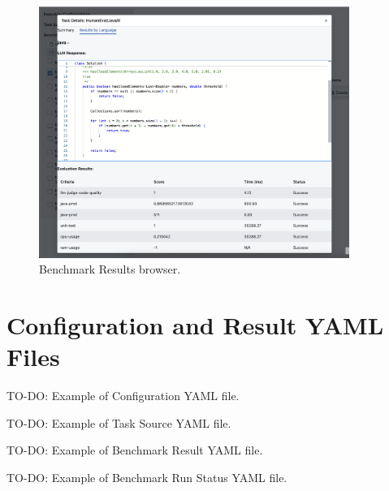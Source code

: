 \begin{figure}[H]
    \includegraphics[width=0.9\textwidth]{./images/ui_result_single_task}
    \caption{Benchmark Results browser. }
    \label{appendix:ui_result_single_task}
\end{figure}

\section{Configuration and Result YAML Files}
\label{appendix:config_files}

TO-DO: Example of Configuration YAML file.

TO-DO: Example of Task Source YAML file.

TO-DO: Example of Benchmark Result YAML file.

TO-DO: Example of Benchmark Run Status YAML file.